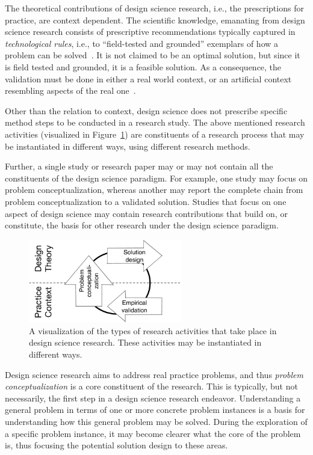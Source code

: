 \documentclass[graybox]{svmult}
\begin{document}
The theoretical contributions of design science research, i.e., the prescriptions for practice, are context dependent. The scientific knowledge, emanating from design science research consists of prescriptive recommendations typically captured in \emph{technological rules}, i.e., to ``field-tested and grounded'' exemplars of how a problem can be solved~\cite{van_aken_management_2004}. It is not claimed to be an optimal solution, but since it is field tested and grounded, it is a feasible solution.
As a consequence, the validation must be done in either a real world context, or an artificial context resembling aspects of the real one~\cite{wieringa_what_2014}.  

Other than the relation to context, design science does not prescribe specific method steps to be conducted in a research study. The above mentioned research activities (visualized in Figure~\ref{fig:DS_process}) are constituents of a research process that may be instantiated in different ways, using different research methods. 

Further, a single study or research paper may or may not contain all the constituents of the design science paradigm. For example, one study may focus on problem conceptualization, whereas another may report the complete chain from problem conceptualization to a validated solution. Studies that focus on one aspect of design science may contain research contributions that build on, or constitute, the basis for other research under the design science paradigm.


\begin{figure}[t]
\centering
 \includegraphics[width=0.6\textwidth]{Figures/DSSE_process.pdf}
\caption{A visualization of the types of research activities that take place in design science research. These activities may be instantiated in different ways.}
\label{fig:DS_process}       %
\end{figure}


Design science research aims to address real practice problems, and thus \emph{problem conceptualization} is a core constituent of the research. This is typically, but not necessarily, the first step in a design science research endeavor. Understanding a general problem in terms of one or more concrete problem instances is a basis for understanding how this general problem may be solved. During the exploration of a specific problem instance, it may become clearer what the core of the problem is, thus focusing the potential solution design to these areas. 
\end{document}

